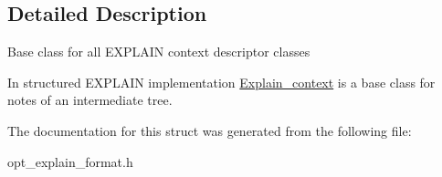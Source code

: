 \subsection{Detailed Description}
Base class for all E\+X\+P\+L\+A\+IN context descriptor classes

In structured E\+X\+P\+L\+A\+IN implementation \mbox{\hyperlink{structExplain__context}{Explain\+\_\+context}} is a base class for notes of an intermediate tree. 

The documentation for this struct was generated from the following file\+:\begin{DoxyCompactItemize}
\item 
opt\+\_\+explain\+\_\+format.\+h\end{DoxyCompactItemize}
